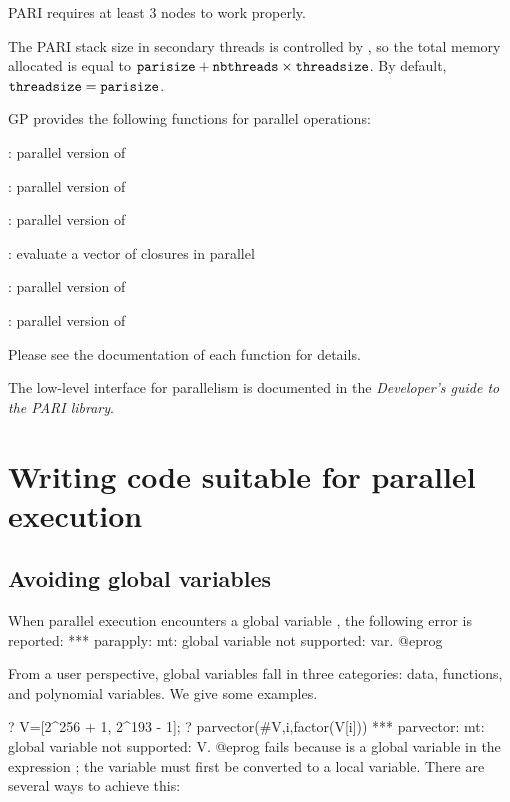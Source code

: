 PARI requires at least $3$ nodes to work properly.


The PARI stack size in secondary threads is controlled by
, so the total memory allocated is equal to
${\tt parisize}+{\tt nbthreads}\times{\tt threadsize}$.  By default,
${\tt threadsize}={\tt parisize}$.


GP provides the following functions for parallel operations:

\item {}: parallel version of 

\item {}:  parallel version of 

\item {}:    parallel version of 

\item {}:   evaluate a vector of closures in parallel

\item {}:    parallel version of 

\item {}:   parallel version of 

Please see the documentation of each function for details.

The low-level  interface for parallelism is documented
in the \emph{Developer's guide to the PARI library}.

\chapter{Writing code suitable for parallel execution}

\section{Avoiding global variables}

When parallel execution encounters a global variable ,
the following error is reported:
\bprog
  *** parapply: mt: global variable not supported: var.
@eprog

From a user perspective, global variables fall in three categories:
data, functions, and polynomial variables. We give some examples.

\bprog
? V=[2^256 + 1, 2^193 - 1];
? parvector(#V,i,factor(V[i]))
  *** parvector: mt: global variable not supported: V.
@eprog\noindent
fails because  is a global variable in the expression
; the variable  must first be converted to a local
variable. There are several ways to achieve this:


